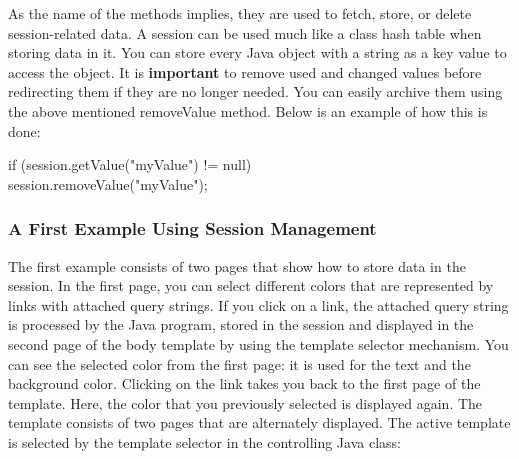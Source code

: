 As the name of the methods implies, they are used to fetch, store, or
delete session-related data. A session can be used much like a class
hash table when storing data in it. You can store every Java object
with a string as a key value to access the object.
It is {\bf important} to remove used and changed values before redirecting
them if they are no longer needed. You can easily archive them using
the above mentioned {\meth removeValue} method. Below is an example of how this
is done:

\begin{java}
if (session.getValue("myValue") != null)\\
        session.removeValue("myValue");\\
\end{java}

\subsubsection{A First Example Using Session Management}
The first example consists of two pages that show how to store data in
the session. In the first page, you can select different colors that
are represented by links with attached query strings. If you click on a
link, the attached query string is processed by the Java program, stored
in the session and displayed in the second page of the body template by
using the template selector mechanism. You can see the selected color
from the first page: it is used for the text and the background color.
Clicking on the link takes you back to the first page of the template.
Here, the color that you previously selected is displayed again.
The template consists of two pages that are alternately displayed. The
active template is selected by the template selector in the controlling
Java class:

